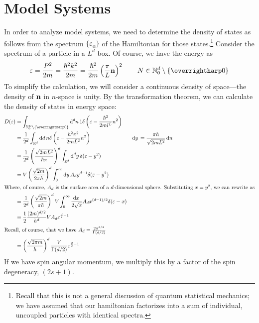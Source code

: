 \section{Model Systems}
In order to analyze model systems, we need to determine the density of states as follows from the spectrum \(\{\varepsilon_\alpha\}\) of the Hamiltonian for those states.\footnote{Recall that this is not a general discussion of quantum statistical mechanics; we have assumed that our hamiltonian factorizes into a sum of individual, uncoupled particles with identical spectra.} Consider the spectrum of a particle in a \(L^d\) box. Of course, we have the energy as
\[\varepsilon = \frac{P^2}{2m} = \frac{\hbar^2k^2}{2m} = \frac{\hbar^2}{2m}\left(\frac{\pi}{L} \vb n\right)^2\qquad N\in \N_0^d\setminus\{\vv 0\}\]
To simplify the calculation, we will consider a continuous density of space---the density of \(\mathbf{n}\) in \(n\)-space is unity. By the transformation theorem, we can calculate the density of states in energy space:
\begin{align*}
	D(\varepsilon) &= \int_{\N_0^D\setminus\{\vv0\}}\d[d]{n} 1 \delta \left(\varepsilon-\frac{\hbar^2}{2ml^L}n^2\right)\\
		       &=\frac{1}{2^d}\int_{\R^d}\d{d}n \delta\left(\varepsilon - \frac{\hbar^2 \pi^2}{2m L^2}n^2\right)&\d{y} = \frac{\pi\hbar}{\sqrt{2mL^2}}\d{n}\\
		       &=\frac{1}{2^d}\left(\frac{\sqrt{2mL^2}}{\hbar\pi}\right)^d\int_{\R^d}\d[d]y\delta(\varepsilon-y^2)\\
		       &=V\left(\frac{\sqrt{2m}}{2\pi\hbar}\right)^d\int_0^\infty\d{y}A_dy^{d-1}\delta(\varepsilon-y^2)\\
		       \intertext{Where, of course, \(A_d\) is the surface area of a \(d\)-dimensional sphere. Substituting \(x=y^2\), we can rewrite as}
		       &=\frac{1}{2^d}\left(\frac{\sqrt{2m}}{\pi\hbar}\right)^d V\int_0^\infty \frac{\d{x}}{2\sqrt{x}}A_d x^{(d-1)/2}\delta (\varepsilon-x)\\
		       &=\frac{1}{2}\frac{(2m)^{d/2}}{h^d} VA_d \varepsilon^{\frac{d}{2}-1}\\
		       \intertext{Recall, of course, that we have \(A_d = \frac{2 \pi^{d/2}}{\Gamma(d/2)}\)}
		       &=\left(\frac{\sqrt{2\pi m}}{h}\right)^d\frac{V}{\Gamma(d/2)}\varepsilon^{\frac{d}{2}-1}
\end{align*}
If we have spin angular momentum, we multiply this by a factor of the spin degeneracy, \((2s+1)\).

